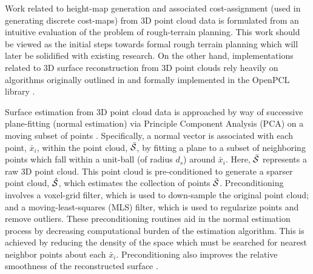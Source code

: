 		Work related to height-map generation and associated cost-assignment (used in generating discrete cost-maps) from 3D point cloud data is formulated from an intuitive evaluation of the problem of rough-terrain planning. This work should be viewed as the initial steps towards formal rough terrain planning which will later be solidified with existing research. On the other hand, implementations related to 3D surface reconstruction from 3D point clouds rely heavily on algorithms originally outlined in \cite{Rusu2009} and formally implemented in the OpenPCL library \cite{openpcl_library}. 

		Surface estimation from 3D point cloud data is approached by way of successive plane-fitting (normal estimation) via Principle Component Analysis (PCA) on a moving subset of points \cite{Rusu2009,Pearson1901}. Specifically, a normal vector is associated with each point, $\bar{x}_{i}$, within the point cloud,  $\bar{{\cal S}}$,  by fitting a plane to a subset of neighboring points which fall within a unit-ball (of radius $d_{s}$) around $\bar{x}_{i}$. Here, $\bar{{\cal S}}$ represents a raw 3D point cloud. This point cloud is pre-conditioned to generate a sparser point cloud, $\hat{{\cal S}}$, which estimates the collection of points $\bar{{\cal S}}$. Preconditioning involves a voxel-grid filter, which is used to down-sample the original point cloud; and a moving-least-squares (MLS) filter, which is used to regularize points and remove outliers. These preconditioning routines aid in the normal estimation process by decreasing computational burden of the estimation algorithm. This is achieved by reducing the density of the space which must be searched for nearest neighbor points about each $\bar{x}_{i}$. Preconditioning also improves the relative smoothness of the reconstructed surface \cite{Rusu2009}. 


